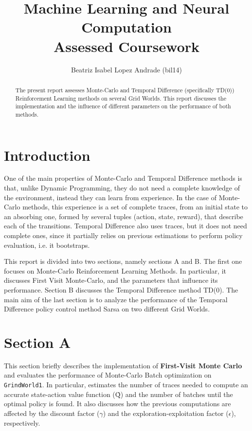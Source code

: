 \documentclass[10pt]{article}   	%
\title{
	Machine Learning and Neural Computation\\
	\textbf{Assessed Coursework}
 }
\author{
	Beatriz Isabel Lopez Andrade (bil14)
}
\begin{document}
\maketitle
\begin{abstract}
The present report assesses Monte-Carlo and Temporal Difference (specifically TD(0)) Reinforcement Learning methods on several Grid Worlds. This report discusses the implementation and the influence of different parameters on the performance of both methods.
\end{abstract}

\section*{Introduction}
One of the main properties of Monte-Carlo and Temporal Difference methods is that, unlike Dynamic Programming, they do not need a complete knowledge of the environment, instead they can learn from experience. In the case of Monte-Carlo methods, this experience is a set of complete traces, from an initial state to an absorbing one, formed by several tuples (action, state, reward), that describe each of the transitions. Temporal Difference also uses traces, but it does not need complete ones, since it partially relies on previous estimations to perform policy evaluation, i.e. it bootstraps. \cite{sutton}

This report is divided into two sections, namely sections A and B. The first one focuses on Monte-Carlo Reinforcement Learning Methods. In particular, it discusses First Visit Monte-Carlo, and the parameters that influence its performance. Section B discusses  the Temporal Difference method TD(0). The main aim of the last section is to analyze the performance of the Temporal Difference  policy control method Sarsa on two different Grid Worlds. 

\section*{Section A}

This section briefly describes the implementation of \textbf{First-Visit Monte Carlo} and evaluates the performance of Monte-Carlo Batch optimization on \texttt{GrindWorld1}. In particular, estimates the number of traces needed to compute an accurate state-action value function (\^{Q}) and the number of batches until the optimal policy is found. It also discusses how the previous computations are affected by the discount factor ($\gamma$) and the exploration-exploitation factor ($\epsilon$), respectively.
\end{document}
